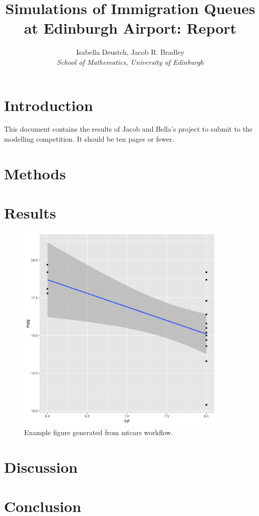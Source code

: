 \documentclass[12pt]{article}
\title{Simulations of Immigration Queues at Edinburgh Airport: Report}
\author{Isabella Deustch, Jacob R. Bradley
 \\ \emph{School of Mathematics, University of Edinburgh}}
\begin{document}
\maketitle

\section{Introduction}
This document contains the results of Jacob and Bella's project to submit to the modelling competition. It should be ten pages or fewer. 
\section{Methods}
\section{Results}

\begin{figure}[htbp]
    \centering
    \includegraphics[width=4in]{figures/mt_cars_summary.png}
    \caption{Example figure generated from mtcars workflow.}
    \label{fig:mtcars}
\end{figure}



\section{Discussion}
\section{Conclusion}
% 
\end{document}
